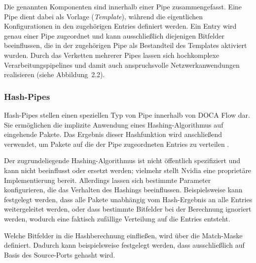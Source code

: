 \documentclass[paper=a4, fontsize=11pt]{scrartcl} %
\numberwithin{equation}{section} %
\numberwithin{figure}{section} %
\numberwithin{table}{section} %
\begin{document}
Die genannten Komponenten sind innerhalb einer Pipe zusammengefasst. Eine Pipe dient dabei als Vorlage (\textit{Template}), während die eigentlichen Konfigurationen in den zugehörigen Entries definiert werden. Ein Entry wird genau einer Pipe zugeordnet und kann ausschließlich diejenigen Bitfelder beeinflussen, die in der zugehörigen Pipe als Bestandteil des Templates aktiviert wurden. Durch das Verketten mehrerer Pipes lassen sich hochkomplexe Verarbeitungspipelines und damit auch anspruchsvolle Netzwerkanwendungen realisieren (siehe Abbildung~2.2).
\subsubsection{Hash-Pipes}
Hash-Pipes stellen einen speziellen Typ von Pipe innerhalb von DOCA Flow dar. Sie ermöglichen die implizite Anwendung eines Hashing-Algorithmus auf eingehende Pakete. Das Ergebnis dieser Hashfunktion wird anschließend verwendet, um Pakete auf die der Pipe zugeordneten Entries zu verteilen \cite{nvidia_doca_flow_pipe_hash}.

Der zugrundeliegende Hashing-Algorithmus ist nicht öffentlich spezifiziert und kann nicht beeinflusst oder ersetzt werden; vielmehr stellt Nvidia eine proprietäre Implementierung bereit. Allerdings lassen sich bestimmte Parameter konfigurieren, die das Verhalten des Hashings beeinflussen. Beispielsweise kann festgelegt werden, dass alle Pakete unabhängig vom Hash-Ergebnis an alle Entries weitergeleitet werden, oder dass bestimmte Bitfelder bei der Berechnung ignoriert werden, wodurch eine faktisch zufällige Verteilung auf die Entries entsteht.

Welche Bitfelder in die Hashberechnung einfließen, wird über die Match-Maske definiert. Dadurch kann beispielsweise festgelegt werden, dass ausschließlich auf Basis des Source-Ports gehasht wird.
\end{document}
